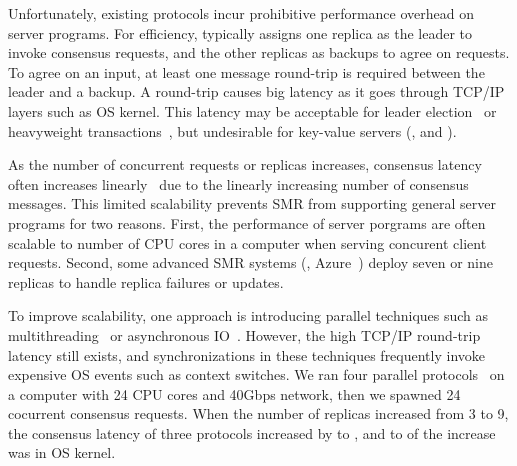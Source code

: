 Unfortunately, existing \paxos protocols incur prohibitive performance overhead 
on server programs. For efficiency, \paxos typically assigns one replica as the 
leader to invoke consensus requests, and the other replicas as backups to agree 
on requests. To agree on an input, at least one message round-trip is required 
between the leader and a backup. A round-trip causes big latency as it goes 
through TCP/IP layers such as OS kernel. This latency may be acceptable for 
leader election~\cite{chubby:osdi,zookeeper} or heavyweight 
transactions~\cite{crane:sosp15,eve:osdi12}, but undesirable for
key-value servers (\eg, \redis and \memcached).


As the number of concurrent requests or replicas increases, \paxos consensus 
latency often increases linearly~\cite{scatter:sosp11} due to the linearly 
increasing number of consensus messages. This limited scalability prevents SMR 
from supporting general server programs for two reasons. First, the 
performance of server porgrams are often scalable to number of CPU cores in a 
computer when serving concurent client requests. Second, some advanced SMR 
systems (\eg, Azure~\cite{azure:book}) deploy seven or nine replicas to handle 
replica failures or updates.

To improve scalability, one approach 
is introducing parallel techniques such as multithreading~\cite{zookeeper, 
spaxos:srds12} or asynchronous IO~\cite{crane:sosp15, libpaxos}. However, the 
high TCP/IP round-trip latency still exists, and synchronizations in these 
techniques frequently invoke expensive OS events such as context switches. We 
ran four parallel \paxos protocols~\cite{zookeeper, spaxos:srds12, 
crane:sosp15, libpaxos} on a computer with 24 CPU cores and 40Gbps network, 
then we spawned 24 cocurrent consensus requests. When the number of replicas 
increased from 3 to 9, the consensus latency of three protocols increased 
by \tradlatencyincreaselow to \tradlatencyincreasehigh, and \systemcostlow to 
\systemcosthigh of the increase was in OS kernel.

